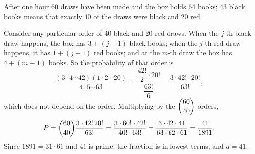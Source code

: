 After one hour $60$ draws have been made and the box holds $64$ books; $43$ black books means that exactly $40$ of the draws were black and $20$ red.

Consider any particular order of $40$ black and $20$ red draws. When the $j$-th black draw happens, the box has $3+(j-1)$ black books; when the $j$-th red draw happens, it has $1+(j-1)$ red books; and at the $m$-th draw the box has $4+(m-1)$ books. So the probability of that order is
\[
\dfrac{(3\cdot4\cdots42)(1\cdot2\cdots20)}{4\cdot5\cdots63}=\dfrac{\dfrac{42!}{2}\cdot20!}{\dfrac{63!}{6}}=\dfrac{3\cdot42!\cdot20!}{63!},
\]
which does not depend on the order. Multiplying by the $\dbinom{60}{40}$ orders,
\[
P=\dbinom{60}{40}\dfrac{3\cdot42!\,20!}{63!}=\dfrac{3\cdot60!\cdot42!}{40!\cdot63!}=\dfrac{3\cdot42\cdot41}{63\cdot62\cdot61}=\dfrac{41}{1891}.
\]
Since $1891=31\cdot61$ and $41$ is prime, the fraction is in lowest terms, and $a=\boxed{41}$.
